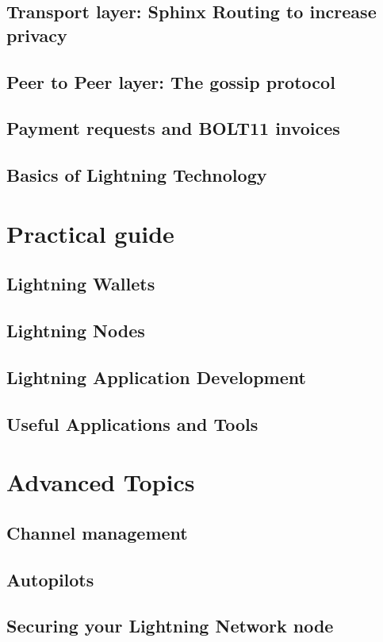 \documentclass[a4paper,12pt,oneside,openany]{book}
\begin{document}
\section{Transport layer: Sphinx Routing to increase privacy}
\section{Peer to Peer layer: The gossip protocol}
\section{Payment requests and BOLT11 invoices}
\section{Basics of Lightning Technology}

\chapter{Practical guide}
\section{Lightning Wallets}
\section{Lightning Nodes}
\section{Lightning Application Development}
\section{Useful Applications and Tools}
\chapter{Advanced Topics}
\section{Channel management}
\section{Autopilots}
\section{Securing your Lightning Network node}
\end{document}
